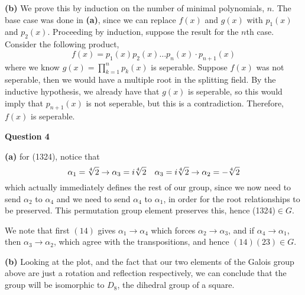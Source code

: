 \documentclass[10pt]{article}
\begin{document}
\textbf{(b)} We prove this by induction on the number of minimal polynomials, $n$. The base case was done in \textbf{(a)}, since we can replace $f(x)$ and $g(x)$ with $p_{1}(x)$ and $p_{2}(x)$. Proceeding by induction, suppose the result for the $n$th case. Consider the following product,
\[ f(x) = p_{1}(x)p_{2}(x) \dots p_{n}(x) \cdot p_{n+1}(x) \]
where we know $g(x) = \prod_{k=1}^{n}p_{k}(x)$ is seperable. Suppose $f(x)$ was not seperable, then we would have a multiple root in the splitting field. By the inductive hypothesis, we already have that $g(x)$ is seperable, so this would imply that $p_{n+1}(x)$ is not seperable, but this is a contradiction. Therefore, $f(x)$ is seperable.

\newpage
\textbf{Question 4}

\textbf{(a)} for (1324), notice that
\[ \alpha_{1} = \sqrt[\leftroot{1}\uproot{0}4]{2} \to \alpha_{3} = i\sqrt[\leftroot{1}\uproot{0}4]{2} \quad \alpha_{3} = i\sqrt[\leftroot{1}\uproot{0}4]{2} \to \alpha_{2} = -\sqrt[\leftroot{1}\uproot{0}4]{2} \]
which actually immediately defines the rest of our group, since we now need to send $\alpha_{2}$ to $\alpha_{4}$ and we need to send $\alpha_{4}$ to $\alpha_{1}$, in order for the root relationships to be preserved. This permutation group element preserves this, hence (1324)$\in G$.

We note that first $(14)$ gives $\alpha_{1} \to \alpha_{4}$ which forces $\alpha_{2} \to \alpha_{3}$, and if $\alpha_{4} \to \alpha_{1}$, then $\alpha_{3} \to \alpha_{2}$, which agree with the transpositions, and hence $(14)(23)\in G$.

\textbf{(b)} Looking at the plot, and the fact that our two elements of the Galois group above are just a rotation and reflection respectively, we can conclude that the group will be isomorphic to $D_{8}$, the dihedral group of a square.
\end{document}
